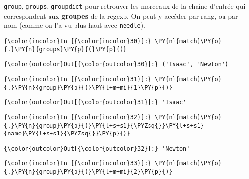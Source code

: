     \texttt{group}, \texttt{groups}, \texttt{groupdict} pour retrouver les
morceaux de la chaîne d'entrée qui correspondent aux \textbf{groupes} de
la regexp. On peut y accéder par rang, ou par nom (comme on l'a vu plus
haut avec \texttt{needle}).

    \begin{Verbatim}[commandchars=\\\{\},frame=single,framerule=0.3mm,rulecolor=\color{cellframecolor}]
{\color{incolor}In [{\color{incolor}30}]:} \PY{n}{match}\PY{o}{.}\PY{n}{groups}\PY{p}{(}\PY{p}{)}
\end{Verbatim}


\begin{Verbatim}[commandchars=\\\{\},frame=single,framerule=0.3mm,rulecolor=\color{cellframecolor}]
{\color{outcolor}Out[{\color{outcolor}30}]:} ('Isaac', 'Newton')
\end{Verbatim}
            
    \begin{Verbatim}[commandchars=\\\{\},frame=single,framerule=0.3mm,rulecolor=\color{cellframecolor}]
{\color{incolor}In [{\color{incolor}31}]:} \PY{n}{match}\PY{o}{.}\PY{n}{group}\PY{p}{(}\PY{l+m+mi}{1}\PY{p}{)}
\end{Verbatim}


\begin{Verbatim}[commandchars=\\\{\},frame=single,framerule=0.3mm,rulecolor=\color{cellframecolor}]
{\color{outcolor}Out[{\color{outcolor}31}]:} 'Isaac'
\end{Verbatim}
            
    \begin{Verbatim}[commandchars=\\\{\},frame=single,framerule=0.3mm,rulecolor=\color{cellframecolor}]
{\color{incolor}In [{\color{incolor}32}]:} \PY{n}{match}\PY{o}{.}\PY{n}{group}\PY{p}{(}\PY{l+s+s1}{\PYZsq{}}\PY{l+s+s1}{name}\PY{l+s+s1}{\PYZsq{}}\PY{p}{)}
\end{Verbatim}


\begin{Verbatim}[commandchars=\\\{\},frame=single,framerule=0.3mm,rulecolor=\color{cellframecolor}]
{\color{outcolor}Out[{\color{outcolor}32}]:} 'Newton'
\end{Verbatim}
            
    \begin{Verbatim}[commandchars=\\\{\},frame=single,framerule=0.3mm,rulecolor=\color{cellframecolor}]
{\color{incolor}In [{\color{incolor}33}]:} \PY{n}{match}\PY{o}{.}\PY{n}{group}\PY{p}{(}\PY{l+m+mi}{2}\PY{p}{)}
\end{Verbatim}


